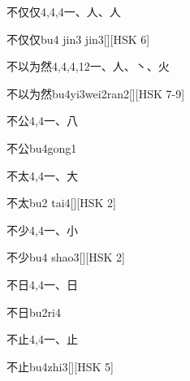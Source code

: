 \begin{Entry}{不仅仅}{4,4,4}{⼀、⼈、⼈}
  \begin{Phonetics}{不仅仅}{bu4 jin3 jin3}[][HSK 6]
  \end{Phonetics}
\end{Entry}

\begin{Entry}{不以为然}{4,4,4,12}{⼀、⼈、⼂、⽕}
  \begin{Phonetics}{不以为然}{bu4yi3wei2ran2}[][HSK 7-9]
  \end{Phonetics}
\end{Entry}

\begin{Entry}{不公}{4,4}{⼀、⼋}
  \begin{Phonetics}{不公}{bu4gong1}
  \end{Phonetics}
\end{Entry}

\begin{Entry}{不太}{4,4}{⼀、⼤}
  \begin{Phonetics}{不太}{bu2 tai4}[][HSK 2]
  \end{Phonetics}
\end{Entry}

\begin{Entry}{不少}{4,4}{⼀、⼩}
  \begin{Phonetics}{不少}{bu4 shao3}[][HSK 2]
  \end{Phonetics}
\end{Entry}

\begin{Entry}{不日}{4,4}{⼀、⽇}
  \begin{Phonetics}{不日}{bu2ri4}
  \end{Phonetics}
\end{Entry}

\begin{Entry}{不止}{4,4}{⼀、⽌}
  \begin{Phonetics}{不止}{bu4zhi3}[][HSK 5]
  \end{Phonetics}
\end{Entry}


